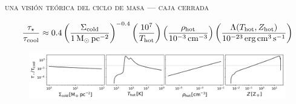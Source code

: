 \documentclass[xcolor=dvipsnames,4pt,hyperref={colorlinks,citecolor=black,linkcolor=black,urlcolor=black}]{beamer}
\begin{document}
\begin{frame}{\textsc{una visión teórica del ciclo de masa --- caja cerrada}}

%
\begin{equation*}
\frac{\tau_\star}{\tau_\text{cool}} \approx 0.4\left(\frac{\Sigma_\text{cold}}{1\,\text{M}_\odot\,\text{pc}^{-2}}\right)^{-0.4}\left(\frac{10^7}{T_\text{hot}}\right)\left(\frac{\rho_\text{hot}}{10^{-3}\,\text{cm}^{-3}}\right)\left(\frac{\Lambda(T_\text{hot},Z_\text{hot})}{10^{-23}\,\text{erg\,cm}^{3}\,\text{s}^{-1}}\right)
\end{equation*}
%
\begin{figure}
\includegraphics[scale=1]{img/time_scales}
\end{figure}

\end{frame}
\end{document}
